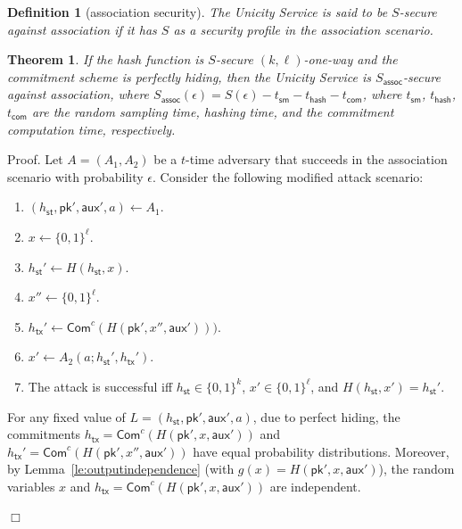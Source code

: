 \documentclass{article}
\newtheorem{definition}{Definition}[section]
\newtheorem{theorem}{Theorem}[section]
\newenvironment{proof}{\textsf{Proof}.}{\hfill$\Box$}
\newcommand{\pubkey}[0]{\mathsf{pk}}
\newcommand{\commitc}[0]{\mathsf{Com}^{c}}
\newcommand{\sthash}[0]{h_\mathsf{st}}
\newcommand{\txhash}[0]{h_\mathsf{tx}}
\newcommand{\auxd}[0]{\mathsf{aux}}
\begin{document}
\begin{definition}[association security]
The Unicity Service is said to be $S$-secure against association if it has $S$ as a security profile in the association scenario.
\end{definition}


\begin{theorem}
If the hash function is $S$-secure $(k,\ell)$-one-way and the commitment scheme is perfectly hiding, then the Unicity Service is $S_\mathsf{assoc}$-secure against association, where $S_\mathsf{assoc}(\epsilon)= S(\epsilon) - t_\mathsf{sm} - t_\mathsf{hash} - t_\mathsf{com}$, where
$t_\mathsf{sm}$, $t_\mathsf{hash}$, $t_\mathsf{com}$ are the random sampling time, hashing time, and the commitment computation time, respectively.
\end{theorem}
\begin{proof}
Let $A=(A_1,A_2)$ be a $t$-time adversary that succeeds in the association scenario with probability $\epsilon$. Consider the following modified attack scenario:
\begin{enumerate}
\item $(\sthash, \pubkey', \auxd', a)\gets A_1$.
\item $x\gets \{0,1\}^\ell$.
\item $\sthash'\gets H(\sthash,x)$.
\item $x''\gets \{0,1\}^\ell$.
\item $\txhash'\gets\commitc(H(\pubkey',x'',\auxd')))$.
\item $x'\gets A_2(a; \sthash',\txhash')$.
\item The attack is successful iff $\sthash\in\{0,1\}^k$, $x'\in\{0,1\}^\ell$, and $H(\sthash,x')=\sthash'$.
\end{enumerate}

\noindent For any fixed value of $L=(\sthash, \pubkey', \auxd', a)$, due to perfect hiding, the commitments $\txhash=\commitc(H(\pubkey',x,\auxd'))$ and $\txhash'=\commitc(H(\pubkey',x'',\auxd'))$ have equal probability distributions. Moreover, by Lemma~\ref{le:outputindependence} (with $g(x)=H(\pubkey',x,\auxd')$), the random variables $x$ and $\txhash=\commitc(H(\pubkey',x,\auxd'))$ are independent.


\end{proof}
\end{document}
